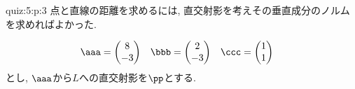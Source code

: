 \begin{answerof}{quiz:5:p:3}
  点と直線の距離を求めるには,
  直交射影を考えその垂直成分のノルムを求めればよかった.


  \begin{align*}
    \aaa&=\begin{pmatrix}8\\-3\end{pmatrix}&
    \bbb&=\begin{pmatrix}2\\-3\end{pmatrix}&
    \ccc&=\begin{pmatrix}1\\1\end{pmatrix}
  \end{align*}
  とし, $\aaa$から$L$への直交射影を$\pp$とする.
  

\end{answerof}

